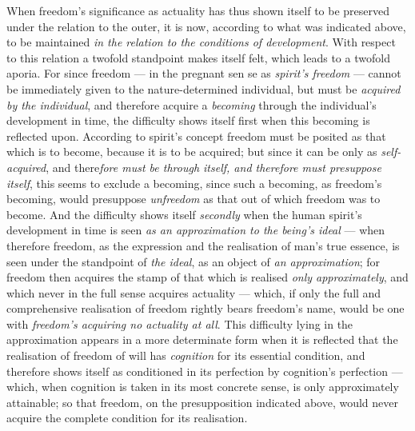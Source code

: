 \documentclass[12pt,a4paper]{book}
\begin{document}
When freedom's significance as actuality has thus shown itself to be preserved
under the relation to the outer, it is now, according to what was indicated
above, to be maintained \emph{in the relation to the conditions of
development}. With respect to this relation a twofold standpoint makes itself
felt, which leads to a twofold aporia. For since freedom --- in the pregnant
sen\-%
se as \emph{spirit's freedom} --- cannot be immediately given to the
nature-determined individual, but must be \emph{acquired by the individual},
and therefore acquire a \emph{becoming} through the individual's development in
time, the difficulty shows itself first when this becoming is reflected upon.
According to spirit's concept freedom must be posited as that which is to
become, because it is to be acquired; but since it can be only as
\emph{self-acquired}, and there\emph{fore must be through itself, and therefore
must presuppose itself}, this seems to exclude a becoming, since such a
becoming, as freedom's becoming, would presuppose \emph{unfreedom} as that out
of which freedom was to become. And the difficulty shows itself \emph{secondly}
when the human spirit's development in time is seen \emph{as an approximation to
the being's ideal} --- when therefore freedom, as the expression and the
realisation of man's true essence, is seen under the standpoint of \emph{the
ideal}, as an object of \emph{an approximation}; for freedom then acquires the
stamp of that which is realised \emph{only approximately}, and which never in
the full sense acquires actuality --- which, if only the full and comprehensive
realisation of freedom rightly bears freedom's name, would be one with
\emph{freedom's acquiring no actuality at all}. This difficulty lying in the
approximation appears in a more determinate form when it is reflected that the
realisation of freedom of will has \emph{cognition} for its essential
condition, and therefore shows itself as conditioned in its perfection by
cognition's perfection --- which, when cognition is taken in its most concrete
sense, is only approximately attainable; so that freedom, on the presupposition
indicated above, would never acquire the complete condition for its
realisation.
\end{document}
